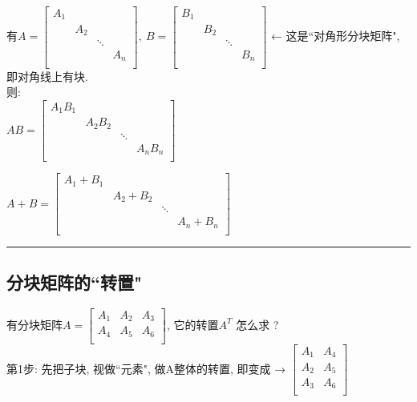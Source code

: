 \documentclass[UTF8]{ctexart}
\begin{document}
有$
A=\left[ \begin{matrix}
	A_1&		&		&		\\
	&		A_2&		&		\\
	&		&		\ddots&		\\
	&		&		&		A_n\\
\end{matrix} \right] ,\ B=\left[ \begin{matrix}
	B_1&		&		&		\\
	&		B_2&		&		\\
	&		&		\ddots&		\\
	&		&		&		B_n\\
\end{matrix} \right] 
$ ← 这是``对角形分块矩阵", 即对角线上有块. \\
则:\\
$
AB=\left[ \begin{matrix}
	A_1B_1&		&		&		\\
	&		A_2B_2&		&		\\
	&		&		\ddots&		\\
	&		&		&		A_nB_n\\
\end{matrix} \right] 
$ \\
\vspace{1em} 

$
A+B=\left[ \begin{matrix}
	A_1+B_1&		&		&		\\
	&		A_2+B_2&		&		\\
	&		&		\ddots&		\\
	&		&		&		A_n+B_n\\
\end{matrix} \right] 
$\\


\hrule

\subsection{分块矩阵的``转置" }

有分块矩阵$
A=\left[ \begin{matrix}
	A_1&		A_2&		A_3\\
	\hline
	A_4&		A_5&		A_6\\
\end{matrix} \right] 
$, 它的转置$A^T$ 怎么求 ? \\

第1步: 先把子块, 视做``元素", 做A整体的转置, 即变成 → $
\left[ \begin{array}{c|c}
	A_1&		A_4\\
	A_2&		A_5\\
	A_3&		A_6\\
\end{array} \right] 
$ \\
\end{document}
